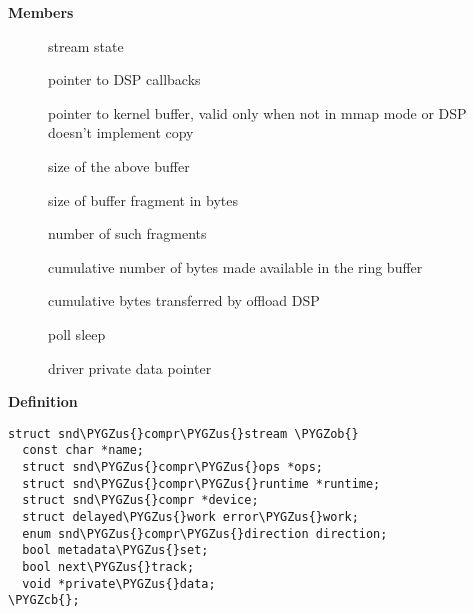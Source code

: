 \documentclass[a4paper,8pt,english]{sphinxmanual}
\def\PYGZus{\char`\_}
\def\PYGZob{\char`\{}
\def\PYGZcb{\char`\}}
\begin{document}
\textbf{Members}
\begin{description}
\item[{}] \leavevmode
stream state

\item[{}] \leavevmode
pointer to DSP callbacks

\item[{}] \leavevmode
pointer to kernel buffer, valid only when not in mmap mode or
DSP doesn't implement copy

\item[{}] \leavevmode
size of the above buffer

\item[{}] \leavevmode
size of buffer fragment in bytes

\item[{}] \leavevmode
number of such fragments

\item[{}] \leavevmode
cumulative number of bytes made available in
the ring buffer

\item[{}] \leavevmode
cumulative bytes transferred by offload DSP

\item[{}] \leavevmode
poll sleep

\item[{}] \leavevmode
driver private data pointer

\end{description}

\begin{fulllineitems}
\label{sound/kernel-api/alsa-driver-api:c.snd_compr_stream}
\end{fulllineitems}


\textbf{Definition}

\begin{Verbatim}[commandchars=\\\{\}]
struct snd\PYGZus{}compr\PYGZus{}stream \PYGZob{}
  const char *name;
  struct snd\PYGZus{}compr\PYGZus{}ops *ops;
  struct snd\PYGZus{}compr\PYGZus{}runtime *runtime;
  struct snd\PYGZus{}compr *device;
  struct delayed\PYGZus{}work error\PYGZus{}work;
  enum snd\PYGZus{}compr\PYGZus{}direction direction;
  bool metadata\PYGZus{}set;
  bool next\PYGZus{}track;
  void *private\PYGZus{}data;
\PYGZcb{};
\end{Verbatim}
\end{document}
